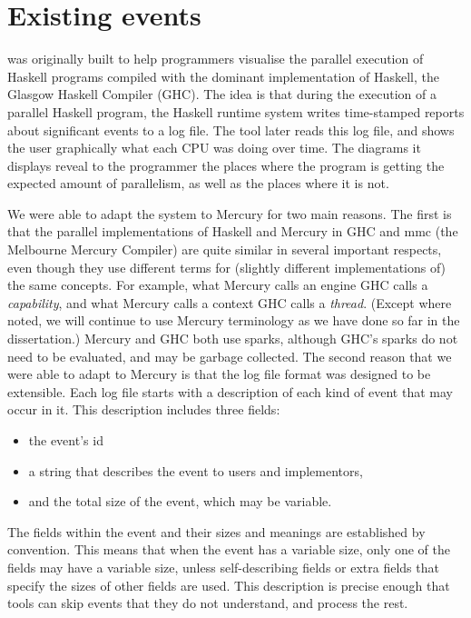 
\section{Existing \tscope events}
\label{sec:tscope_background}

\tscope was originally built
to help programmers visualise the parallel execution of Haskell programs
compiled with the dominant implementation of Haskell,
the Glasgow Haskell Compiler (GHC).
The idea is that during the execution of a parallel Haskell program,
the Haskell runtime system writes time-stamped reports
about significant events to a log file.
The \tscope tool later reads this log file,
and shows the user graphically what each CPU was doing over time.
The diagrams it displays reveal to the programmer
the places where the program is getting the expected amount of parallelism,
as well as the places where it is not.

We were able to adapt the \tscope system to Mercury for two main reasons.
The first is that the parallel implementations of Haskell and Mercury
in GHC and mmc (the Melbourne Mercury Compiler)
are quite similar in several important respects,
even though they use different terms for
(slightly different implementations of) the same concepts.
For example, what Mercury calls an engine GHC calls a \emph{capability},
and what Mercury calls a context GHC calls a \emph{thread}.
(Except where noted,
we will continue to use Mercury terminology as we have done so far in the
dissertation.)
Mercury and GHC both use sparks,
although GHC's sparks do not need to be evaluated,
and may be garbage collected.
The second reason
that we were able to adapt \tscope to Mercury is that
the \tscope log file format was designed to be extensible.
Each log file starts with a description
of each kind of event that may occur in it.
This description includes three fields:
\begin{itemize}
\item the event's id
\item a string that describes the event to users and implementors,
\item and the total size of the event,
which may be variable.
\end{itemize}
The fields within the event and their sizes and meanings are established by
convention.
This means that when the event has a variable size,
only one of the fields may have a variable size,
unless self-describing fields or extra fields that specify the sizes of
other fields are used.
This description is precise enough that tools
can skip events that they do not understand,
and process the rest.

